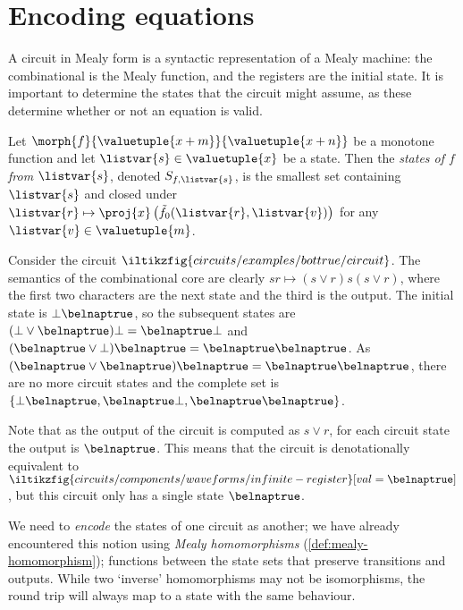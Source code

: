 \section{Encoding equations}\label{sec:encoding}

A circuit in Mealy form is a syntactic representation of a Mealy machine: the
combinational is the Mealy function, and the registers are the initial state.
It is important to determine the states that the circuit might assume, as these
determine whether or not an equation is valid.

\begin{definition}[States]
    Let \(\morph{f}{\valuetuple{x+m}}{\valuetuple{x+n}}\) be a
    monotone function and let \(\listvar{s} \in  \valuetuple{x}\) be a state.
    Then the \emph{states of \(f\) from \(\listvar{s}\)}, denoted
    \(S_{f,\listvar{s}}\), is the smallest set containing \(\listvar{s}\) and
    closed under \(
    \listvar{r}
    \mapsto
    \proj{x}\left(\tilde{f}_0(\listvar{r},\listvar{v})\right)
    \) for any \(\listvar{v} \in \valuetuple{m}\).
\end{definition}

\begin{example}\label{ex:circuit-states}
    Consider the circuit \(
    \iltikzfig{circuits/examples/bottrue/circuit}
    \).
    The semantics of the combinational core are clearly
    \(sr \mapsto (s \lor r)s(s \lor r)\), where the first two characters are the
    next state and the third is the output.
    The initial state is \(\bot\belnaptrue\), so the subsequent states are
    \((\bot \lor \belnaptrue)\bot = \belnaptrue\bot\) and
    \((\belnaptrue \lor \bot)\belnaptrue = \belnaptrue\belnaptrue\).
    As \((\belnaptrue \lor \belnaptrue)\belnaptrue = \belnaptrue\belnaptrue\),
    there are no more circuit states and the complete set is
    \(\{\bot\belnaptrue,\belnaptrue\bot,\belnaptrue\belnaptrue\}\).

    Note that as the output of the circuit is computed as \(s \lor r\), for each
    circuit state the output is \(\belnaptrue\).
    This means that the circuit is denotationally equivalent to \(
    \iltikzfig{circuits/components/waveforms/infinite-register}[val=\belnaptrue]
    \), but this circuit only has a single state \(\belnaptrue\).
\end{example}

We need to \emph{encode} the states of one circuit as another; we have already
encountered this notion using \emph{Mealy homomorphisms}
(\cref{def:mealy-homomorphism});
functions between the state sets that preserve transitions and outputs.
While two `inverse' homomorphisms may not be isomorphisms, the round
trip will always map to a state with the same behaviour.

